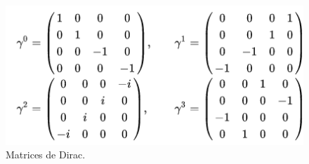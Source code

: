 \documentclass[paper=a4, fontsize=11pt]{scrartcl} %
\numberwithin{equation}{section} %
\numberwithin{figure}{section} %
\numberwithin{table}{section} %
\begin{document}
\begin{figure}[!h]
\begin{center}
\includegraphics[width=0.6\linewidth]{matrices.png}
\end{center}
\caption{Matrices de Dirac.}
\label{matrices}
\end{figure}
\end{document}

